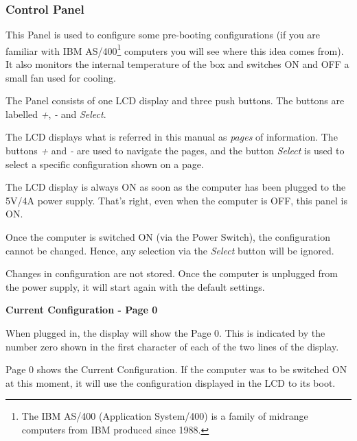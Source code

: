         \subsubsection{Control Panel}
        \label{subsubsec:controlpanel}

        This Panel is used to configure some pre-booting configurations (if you
        are familiar with IBM AS/400\footnote{The IBM AS/400 (Application
        System/400) is a family of midrange computers from IBM produced since
        1988.} computers you will see where this idea comes from). It also
        monitors the internal temperature of the box and switches ON and OFF a
        small fan used for cooling.

        The Panel consists of one LCD display and three push buttons. The
        buttons are labelled \textit{+}, \textit{-} and \textit{Select}.

        The LCD displays what is referred in this manual as \textit{pages} of
        information. The buttons \textit{+} and \textit{-} are used to navigate
        the pages, and the button \textit{Select} is used to select a specific
        configuration shown on a page.

        The LCD display is always ON as soon as the computer has been plugged
        to the 5V/4A power supply. That's right, even when the computer is OFF,
        this panel is ON.

        Once the computer is switched ON (via the Power Switch), the
        configuration cannot be changed. Hence, any selection via the
        \textit{Select} button will be ignored.

        Changes in configuration are not stored. Once the computer is unplugged
        from the power supply, it will start again with the default settings.

        \pagebreak

        \textbf{Current Configuration - Page 0}

        When plugged in, the display will show the Page 0. This is indicated by
        the number zero shown in the first character of each of the two lines of
        the display.

        Page 0 shows the Current Configuration. If the computer was to be
        switched ON at this moment, it will use the configuration displayed in
        the LCD to its boot.

